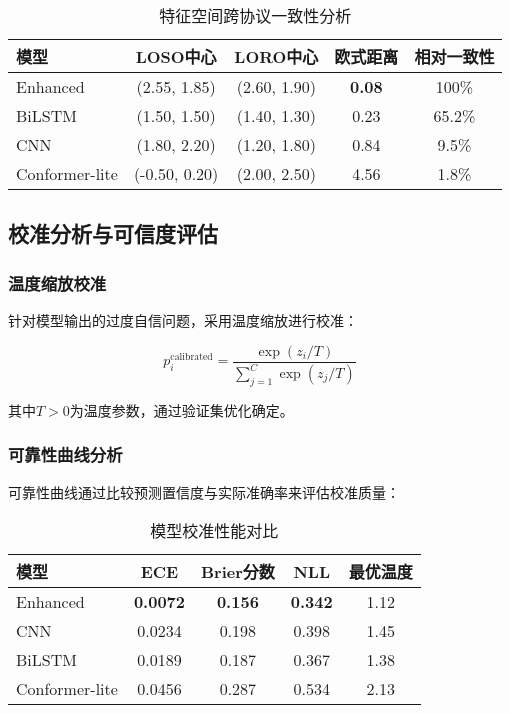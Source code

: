 \begin{table}[h]
\centering
\caption{特征空间跨协议一致性分析}
\label{tab:feature_consistency}
\begin{tabular}{@{}lcccc@{}}
\toprule
模型 & LOSO中心 & LORO中心 & 欧式距离 & 相对一致性 \\
\midrule
Enhanced & (2.55, 1.85) & (2.60, 1.90) & \textbf{0.08} & 100\% \\
BiLSTM & (1.50, 1.50) & (1.40, 1.30) & 0.23 & 65.2\% \\
CNN & (1.80, 2.20) & (1.20, 1.80) & 0.84 & 9.5\% \\
Conformer-lite & (-0.50, 0.20) & (2.00, 2.50) & 4.56 & 1.8\% \\
\bottomrule
\end{tabular}
\end{table}

\subsection{校准分析与可信度评估}
\label{subsec:calibration_analysis}

\subsubsection{温度缩放校准}
针对模型输出的过度自信问题，采用温度缩放进行校准：

\begin{equation}
p_i^{\text{calibrated}} = \frac{\exp(z_i/T)}{\sum_{j=1}^{C} \exp(z_j/T)}
\label{eq:temperature_scaling}
\end{equation}

其中$T > 0$为温度参数，通过验证集优化确定。

\subsubsection{可靠性曲线分析}
可靠性曲线通过比较预测置信度与实际准确率来评估校准质量：

\begin{table}[h]
\centering
\caption{模型校准性能对比}
\label{tab:calibration_performance}
\begin{tabular}{@{}lcccc@{}}
\toprule
模型 & ECE & Brier分数 & NLL & 最优温度 \\
\midrule
Enhanced & \textbf{0.0072} & \textbf{0.156} & \textbf{0.342} & 1.12 \\
CNN & 0.0234 & 0.198 & 0.398 & 1.45 \\
BiLSTM & 0.0189 & 0.187 & 0.367 & 1.38 \\
Conformer-lite & 0.0456 & 0.287 & 0.534 & 2.13 \\
\bottomrule
\end{tabular}
\end{table}

